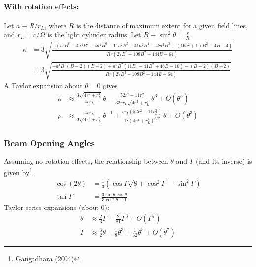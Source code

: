 \documentclass{article}
\begin{document}
\paragraph{With rotation effects:}
Let $a \equiv R/r_L$, where $R$ is the distance of maximum extent for a given field lines, and $r_L = c/\Omega$ is the light cylinder radius.
Let $B \equiv \sin^2\theta = \frac{r}{R}$.
\begin{equation}
    \begin{aligned}
        \kappa &= 3\sqrt{
            \frac{-(a^4B^8 - 4a^4B^7 + 4a^4B^6 -
                   11a^2B^5 + 41a^2B^4 - 48a^2B^3 +
                   (16a^2+1)B^2 - 4B + 4)}{
                       Rr(27B^3 - 108B^2 + 144B - 64)}} \\
           &= 3\sqrt{
               \frac{-a^4B^6(B-2)(B+2) +
                   a^2B^2(11B^3 - 41B^2 + 48B - 16) -
                   (B-2)(B+2)}{
                       Rr(27B^3 - 108B^2 + 144B - 64)}}
    \end{aligned}
\end{equation}
A Taylor expansion about $\theta = 0$ gives
\begin{equation}
    \begin{aligned}
            \kappa &\approx \frac{3\sqrt{4r^2+r_L^2}}{4rr_L}\,\theta -
                            \frac{52r^2 - 11r_L^2}{32rr_L\sqrt{4r^2+r_L^2}}\,\theta^3 +
                            O(\theta^5) \\
            \rho &\approx \frac{4rr_L}{3\sqrt{4r^2+r_L^2}}\,\theta^{-1} +
                          \frac{rr_L(52r^2 - 11r_L^2)}{18(4r^2+r_L^2)^{3/2}}\,\theta +
                          O(\theta^3)
    \end{aligned}
\end{equation}

\subsubsection{Beam Opening Angles}
\label{sec:beamopeningangles}

Assuming no rotation effects, the relationship between $\theta$ and $\Gamma$ (and its inverse) is given by\footnote{Gangadhara (2004)}
\begin{equation}
    \begin{aligned}
        \cos(2\theta) &= \frac13\left(\cos\Gamma\sqrt{8 + \cos^2\Gamma} - \sin^2\Gamma\right) \\
        \tan\Gamma &= \frac{3\sin\theta\cos\theta}{3\cos^2\theta - 1}
    \end{aligned}
\end{equation}
Taylor series expansions (about 0):
\begin{equation}
    \begin{aligned}
        \theta &\approx \frac23 \Gamma - \frac2{81} \Gamma^3 + O(\Gamma^7) \\
        \Gamma &\approx \frac32 \theta + \frac18 \theta^3 + \frac1{32} \theta^5 + O(\theta^7)
    \end{aligned}
\end{equation}
\end{document}
